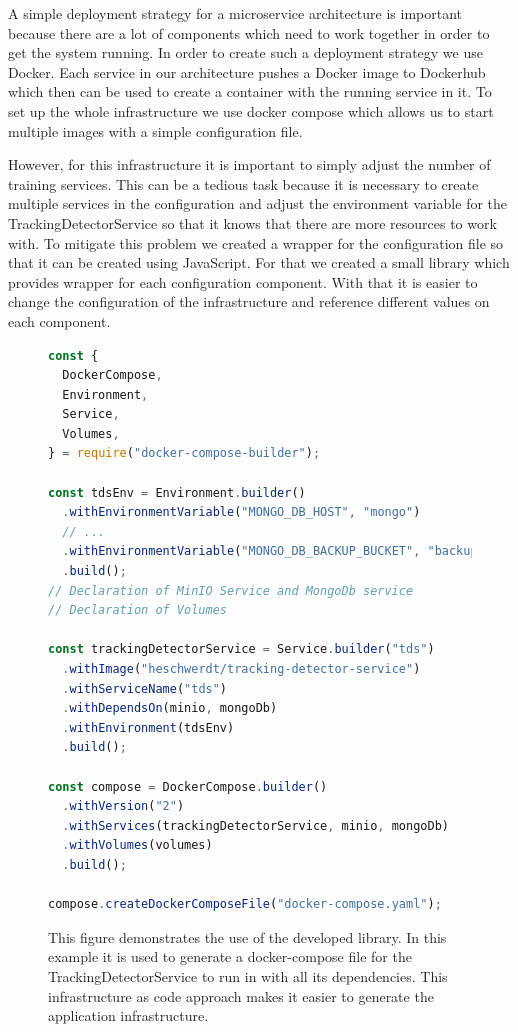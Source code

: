A simple deployment strategy for a microservice architecture is important because there are a lot of components which need to work
together in order to get the system running. In order to create such a deployment strategy we use Docker. Each service in our architecture
pushes a Docker image to Dockerhub which then can be used to create a container with the running service in it. To set up the whole
infrastructure we use docker compose which allows us to start multiple images with a simple configuration file. 

However, for this infrastructure it is important to simply adjust the number of training services. This can be a tedious task because 
it is necessary to create multiple services in the configuration and adjust the environment variable for the TrackingDetectorService so that
it knows that there are more resources to work with. To mitigate this problem we created a wrapper for the configuration file so that it can
be created using JavaScript. For that we created a small library which provides wrapper for each configuration component. With that it is easier
to change the configuration of the infrastructure and reference different values on each component.

\begin{figure}[ht!]
\begin{lstlisting}[language=JavaScript]
const {
  DockerCompose,
  Environment,
  Service,
  Volumes,
} = require("docker-compose-builder");

const tdsEnv = Environment.builder()
  .withEnvironmentVariable("MONGO_DB_HOST", "mongo")
  // ...
  .withEnvironmentVariable("MONGO_DB_BACKUP_BUCKET", "backup")
  .build();
// Declaration of MinIO Service and MongoDb service
// Declaration of Volumes

const trackingDetectorService = Service.builder("tds")
  .withImage("heschwerdt/tracking-detector-service")
  .withServiceName("tds")
  .withDependsOn(minio, mongoDb)
  .withEnvironment(tdsEnv)
  .build();

const compose = DockerCompose.builder()
  .withVersion("2")
  .withServices(trackingDetectorService, minio, mongoDb)
  .withVolumes(volumes)
  .build();

compose.createDockerComposeFile("docker-compose.yaml");
\end{lstlisting}
\caption{This figure demonstrates the use of the developed library. In this example it is used to generate a docker-compose file
for the TrackingDetectorService to run in with all its dependencies. This infrastructure as code approach makes it easier to
generate the application infrastructure.
}
\label{fig:DockerCompose}
\end{figure}

